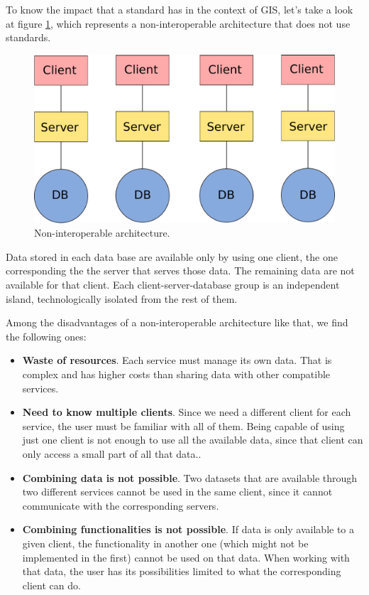 To know the impact that a standard has in the context of GIS, let's take a look at figure \ref{Fig:Non_interoperable}, which represents a non-interoperable architecture that does not use standards.

\begin{figure}[!hbt]   
\centering
\includegraphics[width=.7\columnwidth]{Software/Non_interoperable.pdf}
\caption{\small Non-interoperable architecture.}
\label{Fig:Non_interoperable} 
\end{figure}

Data stored in each data base are available only by using one client, the one corresponding the the server that serves those data. The remaining data are not available for that client. Each client-server-database group is an independent island, technologically isolated from the rest of them.

Among the disadvantages of a non-interoperable architecture like that, we find the following ones:

\begin{itemize}
\item \textbf{Waste of resources}. Each service must manage its own data. That is complex and has higher costs than sharing data with other compatible services.
\item \textbf{Need to know multiple clients}. Since we need a different client for each service, the user must be familiar with all of them. Being capable of using just one client is not enough to use all the available data, since that client can only access a small part of all that data..
\item \textbf{Combining data is not possible}. Two datasets that are available through two different services cannot be used in the same client, since it cannot communicate with the corresponding servers.
\item \textbf{Combining functionalities is not possible}. If data is only available to a given client, the functionality in another one (which might not be implemented in the first) cannot be used on that data. When working with that data, the user has its possibilities limited to what the corresponding client can do.
\end{itemize}

